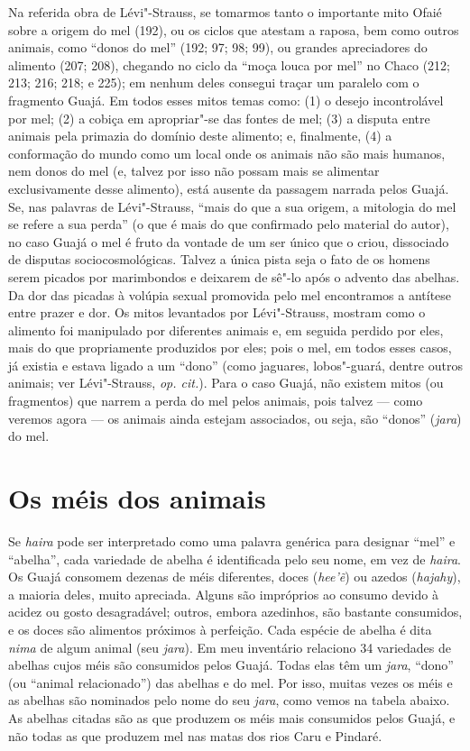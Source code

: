 Na referida obra de Lévi"-Strauss, se tomarmos tanto o importante mito
Ofaié sobre a origem do mel (192), ou os ciclos que atestam a raposa,
bem como outros animais, como ``donos do mel'' (192; 97; 98; 99), ou
grandes apreciadores do alimento (207; 208), chegando no ciclo da
``moça louca por mel'' no Chaco (212; 213; 216; 218; e 225); em
nenhum deles consegui traçar um paralelo com o fragmento Guajá. Em todos
esses mitos temas como: (1) o desejo incontrolável por mel; (2) a cobiça
em apropriar"-se das fontes de mel; (3) a disputa entre animais pela
primazia do domínio deste alimento; e, finalmente, (4) a conformação do
mundo como um local onde os animais não são mais humanos, nem donos do
mel (e, talvez por isso não possam mais se alimentar exclusivamente
desse alimento), está ausente da passagem narrada pelos Guajá. Se, nas
palavras de Lévi"-Strauss, ``mais do que a sua origem, a mitologia do mel
se refere a sua perda'' (o que é mais do que confirmado pelo material do
autor), no caso Guajá o mel é fruto da vontade de um ser único que o
criou, dissociado de disputas sociocosmológicas. Talvez a única pista
seja o fato de os homens serem picados por marimbondos e deixarem de
sê"-lo após o advento das abelhas. Da dor das picadas à volúpia sexual
promovida pelo mel encontramos a antítese entre prazer e dor. Os mitos
levantados por Lévi"-Strauss, mostram como o alimento foi manipulado por
diferentes animais e, em seguida perdido por eles, mais do que
propriamente produzidos por eles; pois o mel, em todos esses casos, já
existia e estava ligado a um ``dono'' (como jaguares, lobos"-guará, dentre
outros animais; ver Lévi"-Strauss, \emph{op. cit.}). Para o caso Guajá, não
existem mitos (ou fragmentos) que narrem a perda do mel pelos animais,
pois talvez --- como veremos agora --- os animais ainda estejam associados,
ou seja, são ``donos'' (\emph{jara}) do mel.

\section{Os méis dos animais}

Se \emph{haira} pode ser interpretado como uma palavra genérica para
designar ``mel'' e ``abelha'', cada variedade de abelha é identificada
pelo seu nome, em vez de \emph{haira}. Os Guajá consomem dezenas de méis
diferentes, doces (\emph{hee'ẽ}) ou azedos (\emph{hajahy}), a maioria
deles, muito apreciada. Alguns são impróprios ao consumo devido à acidez
ou gosto desagradável; outros, embora azedinhos, são bastante
consumidos, e os doces são alimentos próximos à perfeição. Cada espécie
de abelha é dita \emph{nima} de algum animal (seu \emph{jara}). Em meu
inventário relaciono 34 variedades de abelhas cujos méis são consumidos
pelos Guajá. Todas elas têm um \emph{jara}, ``dono'' (ou ``animal
relacionado'') das abelhas e do mel. Por isso, muitas vezes os méis e as
abelhas são nominados pelo nome do seu \emph{jara}, como vemos na tabela
abaixo. As abelhas citadas são as que produzem os méis mais consumidos
pelos Guajá, e não todas as que produzem mel nas matas dos rios Caru e
Pindaré.

